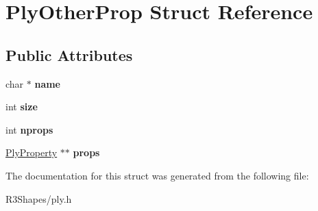 \hypertarget{struct_ply_other_prop}{}\section{Ply\+Other\+Prop Struct Reference}
\label{struct_ply_other_prop}
\subsection*{Public Attributes}
\begin{DoxyCompactItemize}
\item 
char $\ast$ {\bfseries name}\hypertarget{struct_ply_other_prop_a0804a82b034deb5e259996b8e9270d0c}{}\label{struct_ply_other_prop_a0804a82b034deb5e259996b8e9270d0c}

\item 
int {\bfseries size}\hypertarget{struct_ply_other_prop_ae7d96d3736cf602e13f2a308249b60ff}{}\label{struct_ply_other_prop_ae7d96d3736cf602e13f2a308249b60ff}

\item 
int {\bfseries nprops}\hypertarget{struct_ply_other_prop_aebc7f753bbce55f355e5ade8568c35f7}{}\label{struct_ply_other_prop_aebc7f753bbce55f355e5ade8568c35f7}

\item 
\hyperlink{struct_ply_property}{Ply\+Property} $\ast$$\ast$ {\bfseries props}\hypertarget{struct_ply_other_prop_a901cbab454084fb0784975225e9870a8}{}\label{struct_ply_other_prop_a901cbab454084fb0784975225e9870a8}

\end{DoxyCompactItemize}


The documentation for this struct was generated from the following file\+:\begin{DoxyCompactItemize}
\item 
R3\+Shapes/ply.\+h\end{DoxyCompactItemize}
